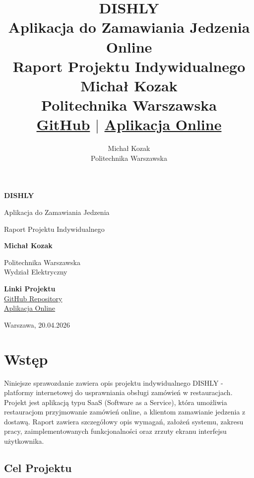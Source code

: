 \documentclass[12pt,a4paper,utf-8]{article}
\title{%
    \textbf{DISHLY} \\
    \large Aplikacja do Zamawiania Jedzenia Online \\
    \large Raport Projektu Indywidualnego \\
    \vspace{0.3cm}
    \normalsize Michał Kozak \\
    \small Politechnika Warszawska \\
    \vspace{0.5cm}
    \tiny \href{https://github.com/podlaskialgorytm3/dishly}{GitHub} $|$ \href{https://dishly-ochre.vercel.app/}{Aplikacja Online}
}
\author{Michał Kozak \\ Politechnika Warszawska}
\date{}
\begin{document}
\begin{titlepage}
    \centering
    \vspace*{2cm}
    
    {\LARGE \textbf{DISHLY}}
    
    \vspace{0.5cm}
    
    {\Huge Aplikacja do Zamawiania Jedzenia}
    
    \vspace{2cm}
    
    {\Large Raport Projektu Indywidualnego}
    
    \vspace{3cm}
    
    {\Large \textbf{Michał Kozak}}
    
    \vspace{2cm}
    
    {\large Politechnika Warszawska} \\
    {\normalsize Wydział Elektryczny}
    
    \vspace{3cm}
    
    {\normalsize \textbf{Linki Projektu}} \\
    \href{https://github.com/podlaskialgorytm3/dishly}{GitHub Repository} \\
    \href{https://dishly-ochre.vercel.app/}{Aplikacja Online}
    
    \vfill
    
    {\normalsize Warszawa, 20.04.2026}
    
\end{titlepage}

\cleardoublepage

\tableofcontents
\newpage

\section{Wstęp}

Niniejsze sprawozdanie zawiera opis projektu indywidualnego DISHLY - platformy internetowej do usprawniania obsługi zamówień w restauracjach. Projekt jest aplikacją typu SaaS (Software as a Service), która umożliwia restauracjom przyjmowanie zamówień online, a klientom zamawianie jedzenia z dostawą. Raport zawiera szczegółowy opis wymagań, założeń systemu, zakresu pracy, zaimplementowanych funkcjonalności oraz zrzuty ekranu interfejsu użytkownika.

\subsection{Cel Projektu}
\end{document}
